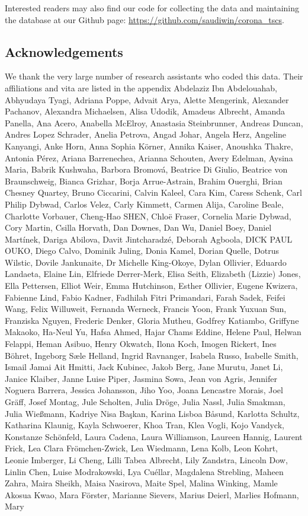 \documentclass[
]{article}
\begin{document}
Interested readers may also find our code for collecting the data and maintaining the database at our Github page: \url{https://github.com/saudiwin/corona_tscs}.

\hypertarget{acknowledgements}{%
\subsection*{Acknowledgements}\label{acknowledgements}}

We thank the very large number of research assistants who coded this data. Their affiliations and vita are listed in the appendix
Abdelaziz Ibn Abdelouahab, Abhyudaya Tyagi, Adriana Poppe, Advait Arya, Alette Mengerink, Alexander Pachanov, Alexandra Michaelsen, Alisa Udodik, Amadeus Albrecht, Amanda Panella, Ana Acero, Anabella McElroy, Anastasia Steinbrunner, Andreas Duncan, Andres Lopez Schrader, Anelia Petrova, Angad Johar, Angela Herz, Angeline Kanyangi, Anke Horn, Anna Sophia Körner, Annika Kaiser, Anoushka Thakre, Antonia Pérez, Ariana Barrenechea, Arianna Schouten, Avery Edelman, Aysina Maria, Babrik Kushwaha, Barbora Bromová, Beatrice Di Giulio, Beatrice von Braunschweig, Bianca Grizhar, Borja Arrue-Astrain, Brahim Ouerghi, Brian Chesney Quartey, Bruno Ciccarini, Calvin Kaleel, Cara Kim, Caress Schenk, Carl Philip Dybwad, Carlos Velez, Carly Kimmett, Carmen Alija, Caroline Beale, Charlotte Vorbauer, Cheng-Hao SHEN, Chloë Fraser, Cornelia Marie Dybwad, Cory Martin, Csilla Horvath, Dan Downes, Dan Wu, Daniel Boey, Daniel Martínek, Dariga Abilova, Davit Jintcharadzé, Deborah Agboola, DICK PAUL OUKO, Diego Calvo, Dominik Juling, Donia Kamel, Dorian Quelle, Dotrus Wilstic, Dovile Jankunaite, Dr Michelle King-Okoye, Dylan Ollivier, Eduardo Landaeta, Elaine Lin, Elfriede Derrer-Merk, Elisa Seith, Elizabeth (Lizzie) Jones, Ella Pettersen, Elliot Weir, Emma Hutchinson, Esther Ollivier, Eugene Kwizera, Fabienne Lind, Fabio Kadner, Fadhilah Fitri Primandari, Farah Sadek, Feifei Wang, Felix Willuweit, Fernanda Werneck, Francis Yoon, Frank Yuxuan Sun, Franziska Nguyen, Frederic Denker, Gloria Mutheu, Godfrey Katiambo, Griffyne Makaoko, Ha-Neul Yu, Hafsa Ahmed, Hajar Chams Eddine, Helene Paul, Helwan Felappi, Heman Asibuo, Henry Okwatch, Ilona Koch, Imogen Rickert, Ines Böhret, Ingeborg Sæle Helland, Ingrid Ravnanger, Isabela Russo, Isabelle Smith, Ismail Jamai Ait Hmitti, Jack Kubinec, Jakob Berg, Jane Murutu, Janet Li, Janice Klaiber, Janne Luise Piper, Jasmina Sowa, Jean von Agris, Jennifer Noguera Barrera, Jessica Johansson, Jiho Yoo, Joana Lencastre Morais, Joel Gräff, Josef Montag, Jule Scholten, Julia Dröge, Julia Nassl, Julia Smakman, Julia Wießmann, Kadriye Nisa Başkan, Karina Lisboa Båsund, Karlotta Schultz, Katharina Klaunig, Kayla Schwoerer, Khoa Tran, Klea Vogli, Kojo Vandyck, Konstanze Schönfeld, Laura Cadena, Laura Williamson, Laureen Hannig, Laurent Frick, Lea Clara Frömchen-Zwick, Lea Wiedmann, Lena Kolb, Leon Kohrt, Leonie Imberger, Li Cheng, Lilli Tabea Albrecht, Lily Zandstra, Lincoln Dow, Linlin Chen, Luise Modrakowski, Lya Cuéllar, Magdalena Strebling, Maheen Zahra, Maira Sheikh, Maisa Nasirova, Maite Spel, Malina Winking, Mamle Akosua Kwao, Mara Förster, Marianne Sievers, Marius Deierl, Marlies Hofmann, Mary 
\end{document}
